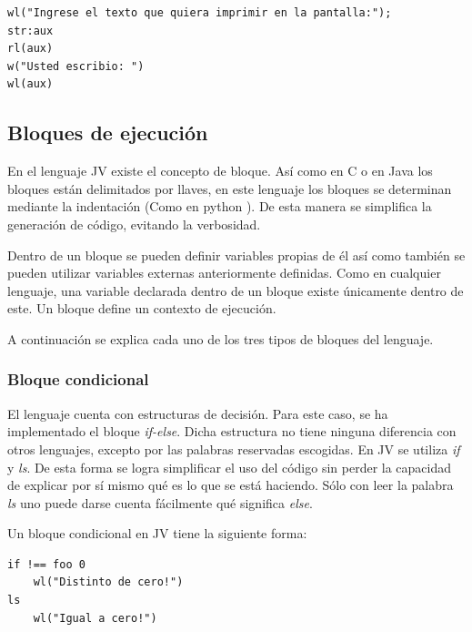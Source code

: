 \documentclass[spanish]{article}
\begin{document}
            \begin{lstlisting}
wl("Ingrese el texto que quiera imprimir en la pantalla:");
str:aux
rl(aux)
w("Usted escribio: ")
wl(aux)
            \end{lstlisting}

        \subsection{Bloques de ejecución}
            \par En el lenguaje JV existe el concepto de bloque. Así como en C \cite{c_strings} o en Java \cite{java_strings} los bloques están delimitados por llaves, en este lenguaje los bloques se determinan mediante la indentación (Como en python \cite{python_grammar}). De esta manera se simplifica la generación de código, evitando la verbosidad.
            \par Dentro de un bloque se pueden definir variables propias de él así como también se pueden utilizar variables externas anteriormente definidas. Como en cualquier lenguaje, una variable declarada dentro de un bloque existe únicamente dentro de este. Un bloque define un contexto de ejecución.
            \par A continuación se explica cada uno de los tres tipos de bloques del lenguaje.

            \subsubsection{Bloque condicional}
                \par El lenguaje cuenta con estructuras de decisión. Para este caso, se ha implementado el bloque \textit{if-else}. Dicha estructura no tiene ninguna diferencia con otros lenguajes, excepto por las palabras reservadas escogidas. En JV se utiliza \textit{if} y \textit{ls}. De esta forma se logra simplificar el uso del código sin perder la capacidad de explicar por sí mismo qué es lo que se está haciendo. Sólo con leer la palabra \textit{ls} uno puede darse cuenta fácilmente qué significa \textit{else}.
                \par Un bloque condicional en JV tiene la siguiente forma:
                \begin{lstlisting}
if !== foo 0
    wl("Distinto de cero!")
ls
    wl("Igual a cero!")
                \end{lstlisting}      
\end{document}
